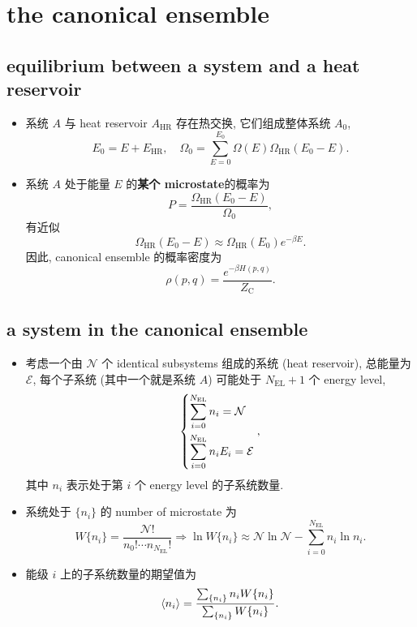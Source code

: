 \chapter{the canonical ensemble}
\section{equilibrium between a system and a heat reservoir}
\begin{itemize}
	\item 系统 $A$ 与 heat reservoir $A_\text{HR}$ 存在热交换, 它们组成整体系统 $A_0$,
	\begin{equation}
		E_0 = E + E_\text{HR}, \quad \Omega_0 = \sum_{E = 0}^{E_0} \Omega(E) \Omega_\text{HR}(E_0 - E).
	\end{equation}
	
	\item 系统 $A$ 处于能量 $E$ 的\textbf{某个 microstate}的概率为
	\begin{equation}
		P = \frac{\Omega_\text{HR}(E_0 - E)}{\Omega_0},
	\end{equation}
	有近似
	\begin{equation}
		\Omega_\text{HR}(E_0 - E) \approx \Omega_\text{HR}(E_0) e^{- \beta E}.
	\end{equation}
	因此, canonical ensemble 的概率密度为
	\begin{equation}
		\rho(p, q) = \frac{e^{- \beta H(p, q)}}{Z_\text{C}}.
	\end{equation}
\end{itemize}

\section{a system in the canonical ensemble}
\begin{itemize}
	\item 考虑一个由 $\mathcal{N}$ 个 identical subsystems 组成的系统 (heat reservoir), 总能量为 $\mathcal{E}$, 每个子系统 (其中一个就是系统 $A$) 可能处于 $N_\text{EL} + 1$ 个 energy level,
	\begin{equation} \label{3.2.1}
		\begin{dcases}
			\sum_{i = 0}^{N_\text{EL}} n_i = \mathcal{N} \\
			\sum_{i = 0}^{N_\text{EL}} n_i E_i = \mathcal{E}
		\end{dcases},
	\end{equation}
	其中 $n_i$ 表示处于第 $i$ 个 energy level 的子系统数量.
	
	\item 系统处于 $\{n_i\}$ 的 number of microstate 为
	\begin{equation}
		W\{n_i\} = \frac{\mathcal{N}!}{n_0! \cdots n_{N_\text{EL}}!} \Longrightarrow \ln W\{n_i\} \approx \mathcal{N} \ln \mathcal{N} - \sum_{i = 0}^{N_\text{EL}} n_i \ln n_i.
	\end{equation}
	
	\item 能级 $i$ 上的子系统数量的期望值为
	\begin{equation} \label{3.2.3}
		\braket{n_i} = \frac{\sum_{\{n_i\}} n_i W\{n_i\}}{\sum_{\{n_i\}} W\{n_i\}}.
	\end{equation}
\end{itemize}


